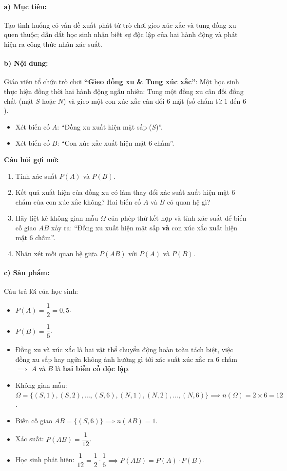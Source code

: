 \documentclass[12pt, a4paper]{article}
\begin{document}
\paragraph{a) Mục tiêu:} Tạo tình huống có vấn đề xuất phát từ trò chơi gieo xúc xắc và tung đồng xu quen thuộc; dẫn dắt học sinh nhận biết sự độc lập của hai hành động và phát hiện ra công thức nhân xác suất.

\paragraph{b) Nội dung:} Giáo viên tổ chức trò chơi \textbf{``Gieo đồng xu \& Tung xúc xắc''}: Một học sinh thực hiện đồng thời hai hành động ngẫu nhiên: Tung một đồng xu cân đối đồng chất (mặt $S$ hoặc $N$) và gieo một con xúc xắc cân đối $6$ mặt (số chấm từ $1$ đến $6$).
\begin{itemize}[leftmargin=0.6cm]
    \item Xét biến cố $A$: ``Đồng xu xuất hiện mặt sấp ($S$)''.
    \item Xét biến cố $B$: ``Con xúc xắc xuất hiện mặt $6$ chấm''.
\end{itemize}
\textbf{Câu hỏi gợi mở:}
\begin{enumerate}[leftmargin=0.6cm]
    \item Tính xác suất $P(A)$ và $P(B)$.
    \item Kết quả xuất hiện của đồng xu có làm thay đổi xác suất xuất hiện mặt $6$ chấm của con xúc xắc không? Hai biến cố $A$ và $B$ có quan hệ gì?
    \item Hãy liệt kê không gian mẫu $\Omega$ của phép thử kết hợp và tính xác suất để biến cố giao $AB$ xảy ra: ``Đồng xu xuất hiện mặt sấp \textbf{và} con xúc xắc xuất hiện mặt $6$ chấm''.
    \item Nhận xét mối quan hệ giữa $P(AB)$ với $P(A)$ và $P(B)$.
\end{enumerate}

\paragraph{c) Sản phẩm:} Câu trả lời của học sinh:
\begin{itemize}[leftmargin=0.8cm]
    \item $P(A) = \dfrac{1}{2} = 0{,}5$.
    \item $P(B) = \dfrac{1}{6}$.
    \item Đồng xu và xúc xắc là hai vật thể chuyển động hoàn toàn tách biệt, việc đồng xu sấp hay ngửa không ảnh hưởng gì tới xác suất xúc xắc ra $6$ chấm $\implies$ $A$ và $B$ là \textbf{hai biến cố độc lập}.
    \item Không gian mẫu: $\Omega = \{(S,1), (S,2), \dots, (S,6), (N,1), (N,2), \dots, (N,6)\} \implies n(\Omega) = 2 \times 6 = 12$.
    \item Biến cố giao $AB = \{(S, 6)\} \implies n(AB) = 1$.
    \item Xác suất: $P(AB) = \dfrac{1}{12}$.
    \item Học sinh phát hiện: $\dfrac{1}{12} = \dfrac{1}{2} \cdot \dfrac{1}{6} \implies P(AB) = P(A) \cdot P(B)$.
\end{itemize}
\end{document}
